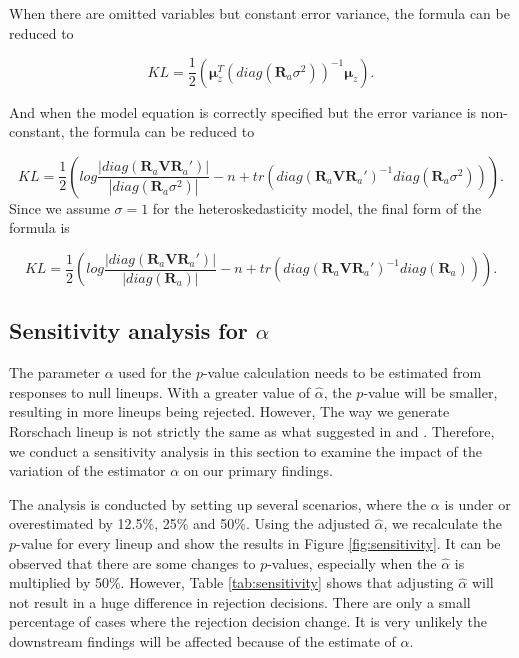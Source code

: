 \documentclass[]{interact}
\theoremstyle{plain}%
\theoremstyle{definition}
\theoremstyle{remark}
\begin{document}
\normalsize

When there are omitted variables but constant error variance, the
formula can be reduced to

\[KL = \frac{1}{2}\left(\boldsymbol{\mu}_z^{T}(diag(\boldsymbol{R}_a\sigma^2))^{-1}\boldsymbol{\mu}_z\right).\]

And when the model equation is correctly specified but the error
variance is non-constant, the formula can be reduced to

\[KL = \frac{1}{2}\left(log\frac{|diag(\boldsymbol{R}_a\boldsymbol{V}\boldsymbol{R}_a')|}{|diag(\boldsymbol{R}_a\sigma^2)|} - n + tr(diag(\boldsymbol{R}_a\boldsymbol{V}\boldsymbol{R}_a')^{-1}diag(\boldsymbol{R}_a\sigma^2))\right).\]
Since we assume \(\sigma = 1\) for the heteroskedasticity model, the
final form of the formula is

\[KL = \frac{1}{2}\left(log\frac{|diag(\boldsymbol{R}_a\boldsymbol{V}\boldsymbol{R}_a')|}{|diag(\boldsymbol{R}_a)|} - n + tr(diag(\boldsymbol{R}_a\boldsymbol{V}\boldsymbol{R}_a')^{-1}diag(\boldsymbol{R}_a))\right).\]

\hypertarget{sensitivity-analysis-for-alpha}{%
\subsection{\texorpdfstring{Sensitivity analysis for
\(\alpha\)}{Sensitivity analysis for \textbackslash alpha}}\label{sensitivity-analysis-for-alpha}}

The parameter \(\alpha\) used for the \(p\)-value calculation needs to
be estimated from responses to null lineups. With a greater value of
\(\hat{\alpha}\), the \(p\)-value will be smaller, resulting in more
lineups being rejected. However, The way we generate Rorschach lineup is
not strictly the same as what suggested in
\citet{vanderplas2021statistical} and \citet{buja_statistical_2009}.
Therefore, we conduct a sensitivity analysis in this section to examine
the impact of the variation of the estimator \(\alpha\) on our primary
findings.

The analysis is conducted by setting up several scenarios, where the
\(\alpha\) is under or overestimated by 12.5\%, 25\% and 50\%. Using the
adjusted \(\hat{\alpha}\), we recalculate the \(p\)-value for every
lineup and show the results in Figure \ref{fig:sensitivity}. It can be
observed that there are some changes to \(p\)-values, especially when
the \(\hat{\alpha}\) is multiplied by 50\%. However, Table
\ref{tab:sensitivity} shows that adjusting \(\hat{\alpha}\) will not
result in a huge difference in rejection decisions. There are only a
small percentage of cases where the rejection decision change. It is
very unlikely the downstream findings will be affected because of the
estimate of \(\alpha\).
\end{document}
